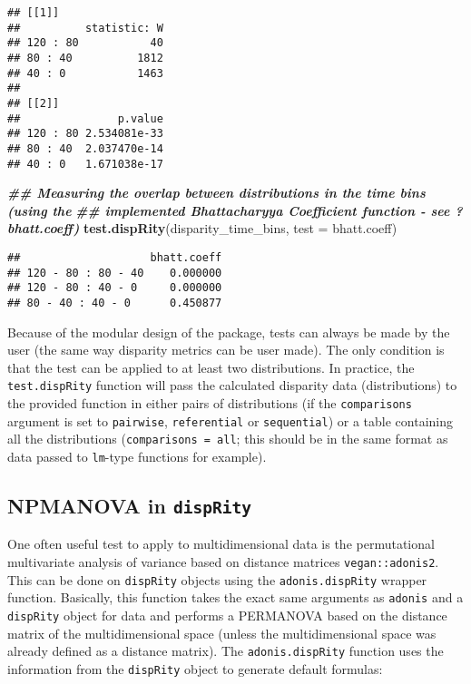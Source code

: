 \documentclass[
]{book}
\newenvironment{Shaded}{\begin{snugshade}}{\end{snugshade}}
\newcommand{\AttributeTok}[1]{\textcolor[rgb]{0.13,0.29,0.53}{#1}}
\newcommand{\DocumentationTok}[1]{\textcolor[rgb]{0.56,0.35,0.01}{\textbf{\textit{#1}}}}
\newcommand{\FunctionTok}[1]{\textcolor[rgb]{0.13,0.29,0.53}{\textbf{#1}}}
\newcommand{\NormalTok}[1]{#1}
\begin{document}
\begin{verbatim}
## [[1]]
##          statistic: W
## 120 : 80           40
## 80 : 40          1812
## 40 : 0           1463
## 
## [[2]]
##               p.value
## 120 : 80 2.534081e-33
## 80 : 40  2.037470e-14
## 40 : 0   1.671038e-17
\end{verbatim}

\begin{Shaded}
\begin{Highlighting}[]
\DocumentationTok{\#\# Measuring the overlap between distributions in the time bins (using the}
\DocumentationTok{\#\# implemented Bhattacharyya Coefficient function {-} see ?bhatt.coeff)}
\FunctionTok{test.dispRity}\NormalTok{(disparity\_time\_bins, }\AttributeTok{test =}\NormalTok{ bhatt.coeff)}
\end{Highlighting}
\end{Shaded}

\begin{verbatim}
##                    bhatt.coeff
## 120 - 80 : 80 - 40    0.000000
## 120 - 80 : 40 - 0     0.000000
## 80 - 40 : 40 - 0      0.450877
\end{verbatim}

Because of the modular design of the package, tests can always be made by the user (the same way disparity metrics can be user made).
The only condition is that the test can be applied to at least two distributions.
In practice, the \texttt{test.dispRity} function will pass the calculated disparity data (distributions) to the provided function in either pairs of distributions (if the \texttt{comparisons} argument is set to \texttt{pairwise}, \texttt{referential} or \texttt{sequential}) or a table containing all the distributions (\texttt{comparisons\ =\ all}; this should be in the same format as data passed to \texttt{lm}-type functions for example).

\hypertarget{adonis}{%
\subsection{\texorpdfstring{NPMANOVA in \texttt{dispRity}}{NPMANOVA in dispRity}}\label{adonis}}

One often useful test to apply to multidimensional data is the permutational multivariate analysis of variance based on distance matrices \texttt{vegan::adonis2}.
This can be done on \texttt{dispRity} objects using the \texttt{adonis.dispRity} wrapper function.
Basically, this function takes the exact same arguments as \texttt{adonis} and a \texttt{dispRity} object for data and performs a PERMANOVA based on the distance matrix of the multidimensional space (unless the multidimensional space was already defined as a distance matrix).
The \texttt{adonis.dispRity} function uses the information from the \texttt{dispRity} object to generate default formulas:
\end{document}
